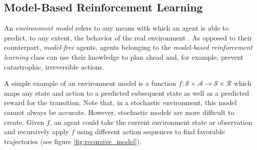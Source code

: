 \subsection{Model-Based Reinforcement Learning}
An \textit{environment model} refers to any means with which an agent is able to predict, to any extent, the behavior of the real environment \cite{bible}. As opposed to their counterpart, \textit{model-free} agents, agents belonging to the \textit{model-based reinforcement learning} class can use their knowledge to plan ahead and, for example, prevent catastrophic, irreversible actions.

A simple example of an environment model is a function $f : \mathscr{S} \times \mathscr{A} \to \mathscr{S} \times \mathscr{R}$ which maps any state and action to a predicted subsequent state as well as a predicted reward for the transition. Note that, in a stochastic environment, this model cannot always be accurate. However, stochastic models are more difficult to create. Given $f$, an agent could take the current environment state or observation and recursively apply $f$ using different action sequences to find favorable trajectories (see figure \ref{fig:recursive_model}).
